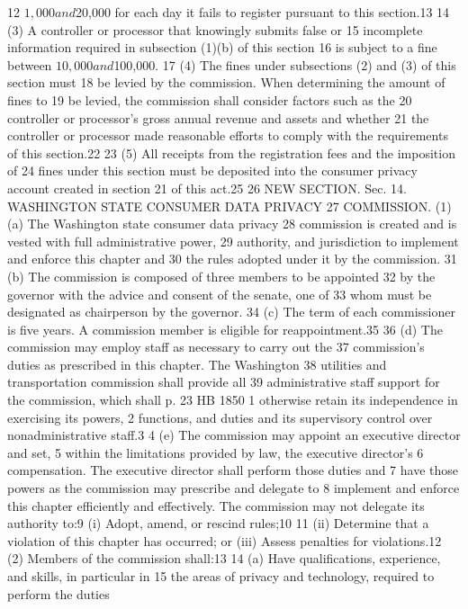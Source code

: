 12 $1,000 and $20,000 for each day it fails to register pursuant to this
section.13
14 (3) A controller or processor that knowingly submits false or
15 incomplete information required in subsection (1)(b) of this section
16 is subject to a fine between $10,000 and $100,000.
17 (4) The fines under subsections (2) and (3) of this section must
18 be levied by the commission. When determining the amount of fines to
19 be levied, the commission shall consider factors such as the
20 controller or processor's gross annual revenue and assets and whether
21 the controller or processor made reasonable efforts to comply with
the requirements of this section.22
23 (5) All receipts from the registration fees and the imposition of
24 fines under this section must be deposited into the consumer privacy
account created in section 21 of this act.25
26 NEW SECTION. Sec. 14. WASHINGTON STATE CONSUMER DATA PRIVACY
27 COMMISSION. (1)(a) The Washington state consumer data privacy
28 commission is created and is vested with full administrative power,
29 authority, and jurisdiction to implement and enforce this chapter and
30 the rules adopted under it by the commission.
31 (b) The commission is composed of three members to be appointed
32 by the governor with the advice and consent of the senate, one of
33 whom must be designated as chairperson by the governor.
34 (c) The term of each commissioner is five years. A commission
member is eligible for reappointment.35
36 (d) The commission may employ staff as necessary to carry out the
37 commission's duties as prescribed in this chapter. The Washington
38 utilities and transportation commission shall provide all
39 administrative staff support for the commission, which shall
p. 23 HB 1850
1 otherwise retain its independence in exercising its powers,
2 functions, and duties and its supervisory control over
nonadministrative staff.3
4 (e) The commission may appoint an executive director and set,
5 within the limitations provided by law, the executive director's
6 compensation. The executive director shall perform those duties and
7 have those powers as the commission may prescribe and delegate to
8 implement and enforce this chapter efficiently and effectively. The
commission may not delegate its authority to:9
(i) Adopt, amend, or rescind rules;10
11 (ii) Determine that a violation of this chapter has occurred; or
(iii) Assess penalties for violations.12
(2) Members of the commission shall:13
14 (a) Have qualifications, experience, and skills, in particular in
15 the areas of privacy and technology, required to perform the duties
